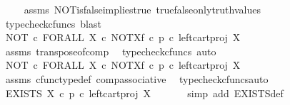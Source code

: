 \begin{isabellebody}
\ \ \ \isamarkupfalse%
\ assms\ NOT{\isacharunderscore}{\kern0pt}is{\isacharunderscore}{\kern0pt}false{\isacharunderscore}{\kern0pt}implies{\isacharunderscore}{\kern0pt}true\ true{\isacharunderscore}{\kern0pt}false{\isacharunderscore}{\kern0pt}only{\isacharunderscore}{\kern0pt}truth{\isacharunderscore}{\kern0pt}values\ \isamarkupfalse%
\ {\isacharparenleft}{\kern0pt}typecheck{\isacharunderscore}{\kern0pt}cfuncs{\isacharcomma}{\kern0pt}\ blast{\isacharparenright}{\kern0pt}\isanewline
\ \isamarkupfalse%
\ \isamarkupfalse%
\ {\isachardoublequoteopen}NOT\ {\isasymcirc}\isactrlsub c\ FORALL\ X\ {\isasymcirc}\isactrlsub c\ NOT\isactrlbsup X\isactrlesup \isactrlsub f\ {\isasymcirc}\isactrlsub c\ {\isacharparenleft}{\kern0pt}p\ {\isasymcirc}\isactrlsub c\ left{\isacharunderscore}{\kern0pt}cart{\isacharunderscore}{\kern0pt}proj\ X\ {\isasymone}{\isacharparenright}{\kern0pt}\isactrlsup {\isasymsharp}\ {\isacharequal}{\kern0pt}\ {\isasymt}{\isachardoublequoteclose}\isanewline
\ \ \ \isamarkupfalse%
\ assms\ transpose{\isacharunderscore}{\kern0pt}of{\isacharunderscore}{\kern0pt}comp\ \isamarkupfalse%
\ {\isacharparenleft}{\kern0pt}typecheck{\isacharunderscore}{\kern0pt}cfuncs{\isacharcomma}{\kern0pt}\ auto{\isacharparenright}{\kern0pt}\isanewline
\ \isamarkupfalse%
\ \isamarkupfalse%
\ {\isachardoublequoteopen}{\isacharparenleft}{\kern0pt}NOT\ {\isasymcirc}\isactrlsub c\ FORALL\ X\ {\isasymcirc}\isactrlsub c\ NOT\isactrlbsup X\isactrlesup \isactrlsub f{\isacharparenright}{\kern0pt}\ {\isasymcirc}\isactrlsub c\ {\isacharparenleft}{\kern0pt}p\ {\isasymcirc}\isactrlsub c\ left{\isacharunderscore}{\kern0pt}cart{\isacharunderscore}{\kern0pt}proj\ X\ {\isasymone}{\isacharparenright}{\kern0pt}\isactrlsup {\isasymsharp}\ {\isacharequal}{\kern0pt}\ {\isasymt}{\isachardoublequoteclose}\isanewline
\ \ \ \ \isamarkupfalse%
\ assms\ cfunc{\isacharunderscore}{\kern0pt}type{\isacharunderscore}{\kern0pt}def\ comp{\isacharunderscore}{\kern0pt}associative\ \isamarkupfalse%
\ {\isacharparenleft}{\kern0pt}typecheck{\isacharunderscore}{\kern0pt}cfuncs{\isacharcomma}{\kern0pt}auto{\isacharparenright}{\kern0pt}\isanewline
\ \isamarkupfalse%
\ \isamarkupfalse%
\ {\isachardoublequoteopen}EXISTS\ X\ {\isasymcirc}\isactrlsub c\ {\isacharparenleft}{\kern0pt}p\ {\isasymcirc}\isactrlsub c\ left{\isacharunderscore}{\kern0pt}cart{\isacharunderscore}{\kern0pt}proj\ X\ {\isasymone}{\isacharparenright}{\kern0pt}\isactrlsup {\isasymsharp}\ {\isacharequal}{\kern0pt}\ {\isasymt}{\isachardoublequoteclose}\isanewline
\ \ \isamarkupfalse%
\ {\isacharparenleft}{\kern0pt}simp\ add{\isacharcolon}{\kern0pt}\ EXISTS{\isacharunderscore}{\kern0pt}def{\isacharparenright}{\kern0pt}\isanewline
{}\isamarkupfalse%
%
\endisatagproof
{\isafoldproof}%
%
\isadelimproof
\isanewline
%
\endisadelimproof
%
\isadelimtheory
\isanewline
%
\endisadelimtheory
%
\isatagtheory
{}\isamarkupfalse%
%
\endisatagtheory
{\isafoldtheory}%
%
\isadelimtheory
%
\endisadelimtheory
%
\end{isabellebody}%
